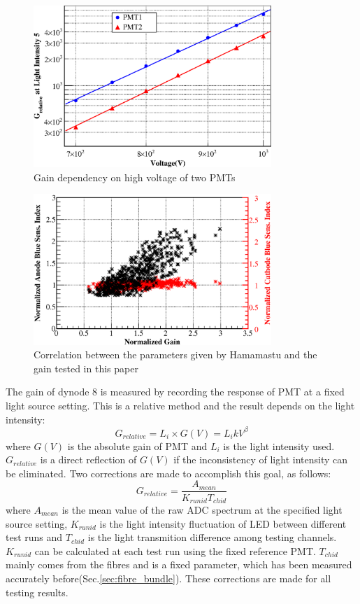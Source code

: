 \documentclass[5p, times]{elsarticle}
\begin{document}
\begin{figure}[h!]
 \centering
 \includegraphics[width=90mm]{gainVSvoltage}
\caption{Gain dependency on high voltage of two PMTs}
\label{fig:gainVSvoltage}
\end{figure} 

\begin{figure}[h!]
 \centering
 \includegraphics[width=90mm]{correlation}
\caption{Correlation between the parameters given by Hamamastu and the gain tested in this paper}
\label{fig:gain_correlation}
\end{figure} 

The gain of dynode 8 is measured by recording the response of PMT at a fixed light source setting. 
This is a relative method and the result depends on the light intensity:
\begin{equation}
 G_{relative} = L_i \times G(V) = L_i k V^\beta
\end{equation}
where $G(V)$ is the absolute gain of PMT and $L_i$ is the light intensity used.
$G_{relative}$ is a direct reflection of $G(V)$ if the inconsistency of light intensity can be eliminated.
Two corrections are made to accomplish this goal, as follows: 
\begin{equation}
 G_{relative} = \frac{A_{mean}}{K_{runid} T_{chid}}
\end{equation} 
where $A_{mean}$ is the mean value of the raw ADC spectrum at the specified light source setting,
$K_{runid}$ is the light intensity fluctuation of LED between different test runs and $T_{chid}$ is the light transmition difference among testing channels.
$K_{runid}$ can be calculated at each test run using the fixed reference PMT.
$T_{chid}$ mainly comes from the fibres and is a fixed parameter, which has been measured accurately before(Sec.\ref{sec:fibre_bundle}).
These corrections are made for all testing results.
\end{document}
